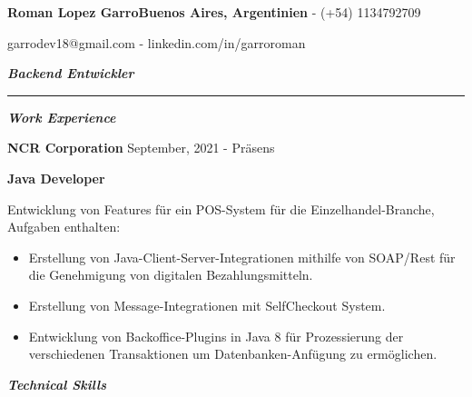 \documentclass{article}
\begin{document}
\fontsize{18pt}{0pt}
\noindent\textbf{Roman Lopez Garro}\hfill\fontsize{10pt}{0pt}\textbf{Buenos Aires, Argentinien} - (+54) 1134792709

\hfill garrodev18@gmail.com - linkedin.com/in/garroroman

\vspace{1mm}

\fontsize{13pt}{0pt}
\noindent\textit{\textbf{Backend Entwickler}}
\par\noindent\rule{\textwidth}{0.4pt}

\vspace{4mm}
\fontsize{12pt}{0pt}
\begin{center}
    \textit{\textbf{Work Experience}}
\end{center}

\vspace{1mm}
\setlength{\parindent}{11pt}\fontsize{10pt}{0pt}\textbf{NCR Corporation} \hfill September, 2021 - Präsens

\vspace{1mm}
\setlength{\parindent}{11pt}\fontsize{10pt}{0pt}\textbf{Java Developer}

\vspace{4mm}
\indent Entwicklung von Features für ein POS-System für die Einzelhandel-Branche, Aufgaben enthalten:
\begin{itemize}
    \item Erstellung von Java-Client-Server-Integrationen mithilfe von SOAP/Rest für die Genehmigung von digitalen Bezahlungsmitteln.
    \item Erstellung von Message-Integrationen mit SelfCheckout System.
    \item Entwicklung von Backoffice-Plugins in Java 8 für Prozessierung der verschiedenen Transaktionen um Datenbanken-Anfügung zu ermöglichen.

\end{itemize}

\vspace{4mm}
\fontsize{12pt}{0pt}
\begin{center}
    \textit{\textbf{Technical Skills}}
\end{center}
\end{document}
